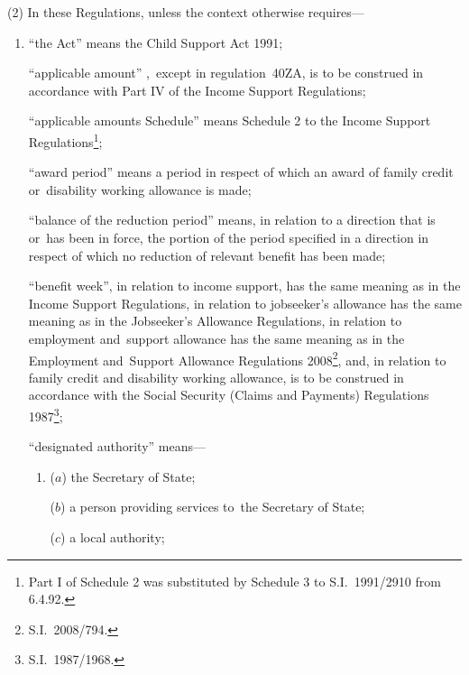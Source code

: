 \documentclass[a4paper,12pt]{article}
\begin{document}
(2) In these Regulations, unless the context otherwise requires—
\begin{enumerate}\item[]
“the Act” means the Child Support Act 1991;

“applicable amount”%
,~except in regulation~40ZA,  %
 is to be construed in accordance with Part IV of the Income Support Regulations;

“applicable amounts Schedule” means Schedule 2 to the Income Support Regulations\footnote{\frenchspacing Part I of Schedule 2 was substituted by Schedule 3 to S.I.~1991/2910 from 6.4.92.};

“award period” means a period in respect of which an award of family credit or~disability working allowance is made;

“balance of the reduction period” means, in relation to a direction that is or~has been in force, the portion of the period specified in a direction in respect of which no reduction of relevant benefit has been made;

“benefit week”, in relation to income support, has the same meaning as in the Income Support Regulations, 
in relation to jobseeker’s allowance has the same meaning as in the Jobseeker’s Allowance Regulations,  %
in relation to employment and~support allowance has the same meaning as in the Employment and~Support Allowance Regulations 2008\footnote{S.I.~2008/794.},  %
and, in relation to family credit and disability working allowance, is to be construed in accordance with the Social Security (Claims and Payments) Regulations 1987\footnote{\frenchspacing S.I.~1987/1968.};


    “designated authority” means—
\begin{enumerate}\item[]
    ($a$) 
    the Secretary of State;

    ($b$) 
    a person providing services to~the Secretary of State;

    ($c$) 
    a local authority;


\end{enumerate}
\end{enumerate}
\end{document}
